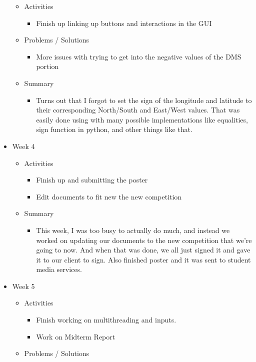 \begin{itemize}
\begin{itemize}
\item Activities
\begin{itemize}
\item Finish up linking up buttons and interactions in the GUI
\end{itemize}
\item Problems / Solutions
\begin{itemize}
\item More issues with trying to get into the negative values of the DMS portion
\end{itemize}
\item Summary
\begin{itemize}
\item Turns out that I forgot to set the sign of the longitude and latitude to their corresponding North/South and East/West values. That was easily done using with many possible implementations like equalities, sign function in python, and other things like that.
\end{itemize}
\end{itemize}
\item Week 4
\begin{itemize}
\item Activities
\begin{itemize}
\item Finish up and submitting the poster
\item Edit documents to fit new the new competition
\end{itemize}
\item Summary
\begin{itemize}
\item This week, I was too busy to actually do much, and instead we worked on updating our documents to the new competition that we're going to now. And when that was done, we all just signed it and gave it to our client to sign. Also finished poster and it was sent to student media services.
\end{itemize}
\end{itemize}
\item Week 5
\begin{itemize}
\item Activities
\begin{itemize}
\item Finish working on multithreading and inputs.
\item Work on Midterm Report
\end{itemize}
\item Problems / Solutions

\end{itemize}
\end{itemize}
